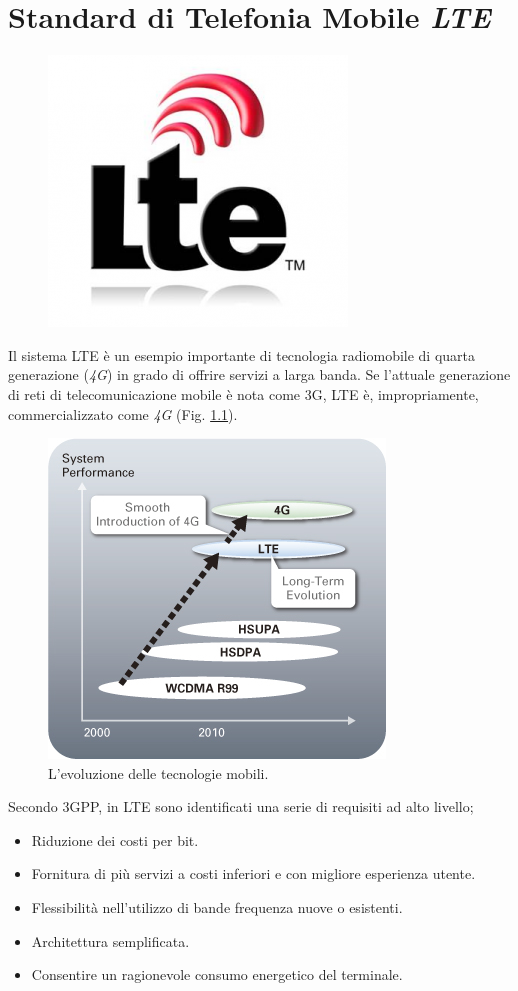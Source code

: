 \chapter{Standard di Telefonia Mobile \emph{LTE}}
\label{cap:lte}
\begin{figure}[h]
\includegraphics[scale=0.5]{Immagini/lte}
\centering 
\end{figure}

Il sistema \ac{LTE} è un esempio importante di tecnologia radiomobile di quarta generazione (\emph{4G}) in grado di offrire servizi 
a larga banda. Se l'attuale generazione di reti di telecomunicazione mobile è nota come 3G, \ac{LTE} è, impropriamente, commercializzato 
come \emph{4G} (Fig. \ref{img:lte4g}).

\begin{figure}
 \centering
 \includegraphics[scale=0.5]{Immagini/lte4g}
 \caption{L'evoluzione delle tecnologie mobili.}
 \label{img:lte4g}
\end{figure}

Secondo \ac{3GPP}, in \ac{LTE} sono identificati una serie di requisiti ad alto livello;
\begin{itemize}
 \item Riduzione dei costi per bit.
 \item Fornitura di più servizi a costi inferiori e con migliore esperienza utente.
 \item Flessibilità nell'utilizzo di bande frequenza nuove o esistenti.
 \item Architettura semplificata.
 \item Consentire un ragionevole consumo energetico del terminale.
\end{itemize}

